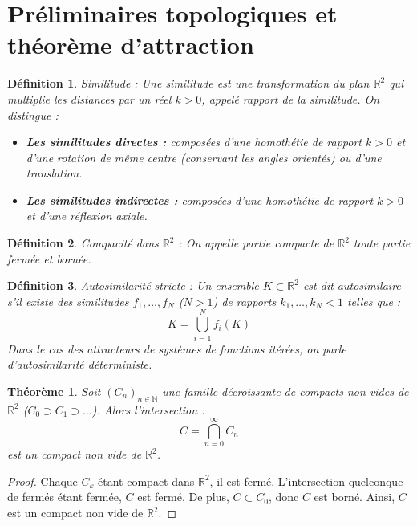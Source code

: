 \documentclass[11pt,a4paper]{article}
\newtheorem{definition}{Définition}[section]
\newtheorem{theorem}{Théorème}[section]
\begin{document}
\section{Préliminaires topologiques et théorème d'attraction}

\begin{definition} \textit{Similitude} :
Une similitude est une transformation du plan $\mathbb{R}^2$ qui multiplie les distances par un réel $k > 0$, appelé rapport de la similitude. On distingue :
\begin{itemize}
    \item \textbf{Les similitudes directes :} composées d'une homothétie de rapport $k > 0$ et d'une rotation de même centre (conservant les angles orientés) ou d'une translation.
    \item \textbf{Les similitudes indirectes :} composées d'une homothétie de rapport $k > 0$ et d'une réflexion axiale.
\end{itemize}
\end{definition}

\begin{definition} \textit{Compacité dans $\mathbb{R}^2$} : 
On appelle partie compacte de $\mathbb{R}^2$ toute partie fermée et bornée.
\end{definition}

\begin{definition} \textit{Autosimilarité stricte} : 
Un ensemble $K \subset \mathbb{R}^2$ est dit autosimilaire s'il existe des similitudes $f_1, \dots, f_N$ ($N > 1$) de rapports $k_1, \dots, k_N < 1$ telles que :
\begin{equation}
K = \bigcup_{i=1}^{N} f_i(K)
\end{equation}
Dans le cas des attracteurs de systèmes de fonctions itérées, on parle d'autosimilarité déterministe.
\end{definition}

\begin{theorem}
Soit $(C_n)_{n \in \mathbb{N}}$ une famille décroissante de compacts non vides de $\mathbb{R}^2$ ($C_0 \supset C_1 \supset \dots$). Alors l'intersection :
\begin{equation}
C = \bigcap_{n=0}^{\infty} C_n
\end{equation}
est un compact non vide de $\mathbb{R}^2$.
\end{theorem}

\begin{proof}
Chaque $C_k$ étant compact dans $\mathbb{R}^2$, il est fermé. L'intersection quelconque de fermés étant fermée, $C$ est fermé. De plus, $C \subset C_0$, donc $C$ est borné. Ainsi, $C$ est un compact non vide de $\mathbb{R}^2$.
\end{proof}
\end{document}
